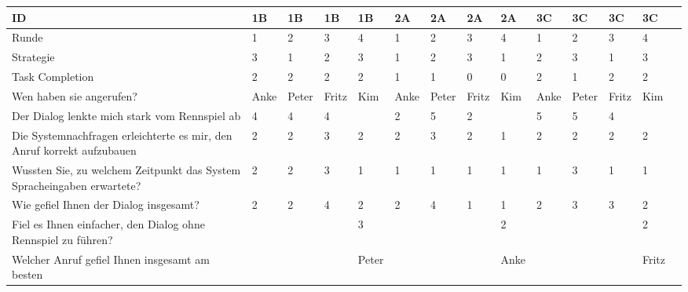 \documentclass[12pt,a4paper]{scrartcl}
\begin{document}
\begin{appendix}
\begin{table}
\begin{tabular}{|p{6cm}| p{0.8cm} | p{0.8cm} | p{0.8cm} | p{0.8cm} || p{0.8cm} | p{0.8cm} | p{0.8cm} | p{0.8cm} || p{0.8cm} | p{0.8cm} | p{0.8cm} | p{0.8cm} | p{} | }
ID & 1B & 1B & 1B & 1B & 2A & 2A & 2A & 2A & 3C & 3C & 3C & 3C \\ \hline \hline
Runde & 1 & 2 & 3 & 4 & 1 & 2 & 3 & 4 & 1 & 2 & 3 & 4 \\ \hline
	Strategie & 3 & 1 & 2 & 3 & 1 & 2 & 3 & 1 & 2 & 3 & 1 & 3 \\ \hline \hline
	Task Completion & 2 & 2 & 2 & 2 & 1 & 1 & 0 & 0 & 2 & 1 & 2 & 2 \\ \hline \hline
	Wen haben sie angerufen? & Anke & Peter & Fritz & Kim & Anke & Peter & Fritz & Kim & Anke & Peter & Fritz & Kim \\ \hline
	Der Dialog lenkte mich stark vom Rennspiel ab & 4 & 4 & 4 &  & 2 & 5 & 2 &  & 5 & 5 & 4 &  \\ \hline
	Die Systemnachfragen erleichterte es mir, den Anruf korrekt aufzubauen & 2 & 2 & 3 & 2 & 2 & 3 & 2 & 1 & 2 & 2 & 2 & 2 \\ \hline
	Wussten Sie, zu welchem Zeitpunkt das System Spracheingaben erwartete? & 2 & 2 & 3 & 1 & 1 & 1 & 1 & 1 & 1 & 3 & 1 & 1 \\ \hline
	Wie gefiel Ihnen der Dialog insgesamt? & 2 & 2 & 4 & 2 & 2 & 4 & 1 & 1 & 2 & 3 & 3 & 2 \\ \hline
	Fiel es Ihnen einfacher, den Dialog ohne Rennspiel zu führen? &  &  &  & 3 &  &  &  & 2 &  &  &  & 2 \\ \hline
	Welcher Anruf gefiel Ihnen insgesamt am besten &  &  &  & Peter  &  &  &  & Anke &  &  &  & Fritz \\ \hline
\end{tabular}
\end{table}


\end{appendix}
\end{document}
